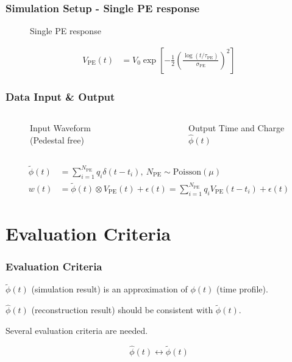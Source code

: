 \documentclass{beamer}
\begin{document}
\begin{CJK*}{UTF8}{gbsn}
\begin{frame}
\frametitle{Simulation Setup - Single PE response}
\begin{figure}
    \centering
    \resizebox{0.6\textwidth}{!}{}
    \caption{Single PE response\cite{jetter_pmt_2012}}
\end{figure}
\begin{align*}
  V_\mathrm{PE}(t) &= V_{0}\exp\left[-\frac{1}{2}\left(\frac{\log(t/\tau_\mathrm{PE})}{\sigma_\mathrm{PE}}\right)^{2}\right]
\end{align*}
\end{frame}

\begin{frame}
\frametitle{Data Input \& Output}
\begin{columns}
\begin{figure}
    \centering
    \resizebox{1.0\textwidth}{!}{}
    \caption{Input Waveform (Pedestal free)}
\end{figure}
\begin{figure}
    \centering
    \resizebox{1.0\textwidth}{!}{}
    \caption{Output Time and Charge $\hat\phi(t)$}
\end{figure}
\end{columns}
\begin{align*}
  \tilde{\phi}(t) &= \sum_{i=1}^{N_{\mathrm{PE}}} q_i \delta(t-t_i), \ N_{\mathrm{PE}}\sim \mathrm{Poisson}(\mu) \\
  w(t) &= \tilde{\phi}(t) \otimes V_\mathrm{PE}(t) + \epsilon(t) = \sum_{i=1}^{N_\mathrm{PE}} q_i V_\mathrm{PE}(t-t_i) + \epsilon(t)
\end{align*}
\end{frame}

\section{Evaluation Criteria}

\begin{frame}
\frametitle{Evaluation Criteria}
$\tilde{\phi}(t)$ (simulation result) is an approximation of $\phi(t)$ (time profile). 

$\hat{\phi}(t)$ (reconstruction result) should be consistent with $\tilde{\phi}(t)$. 

Several evaluation criteria are needed. 
\begin{block}{}
\begin{equation*}
    \hat{\phi}(t) \leftrightarrow \tilde{\phi}(t)
\end{equation*}
\end{block}
\end{frame}


\end{CJK*}
\end{document}
